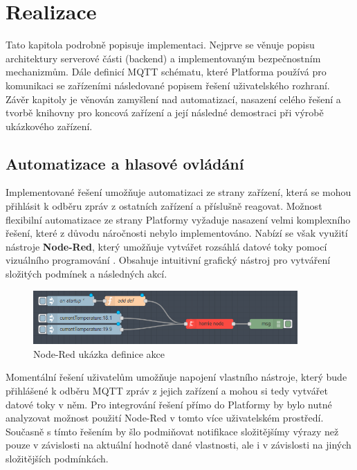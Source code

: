\chapter{Realizace}
Tato kapitola podrobně popisuje implementaci. Nejprve se věnuje popisu architektury serverové části (backend) a implementovaným bezpečnostním mechanizmům. Dále definicí MQTT schématu, které Platforma používá pro komunikaci se zařízeními následované popisem řešení uživatelského rozhraní. Závěr kapitoly je věnován zamyšlení nad automatizací, nasazení celého řešení a tvorbě knihovny pro koncová zařízení a její následné demostraci při výrobě ukázkového zařízení.





\section{Automatizace a hlasové ovládání}
Implementované řešení umožňuje automatizaci ze strany zařízení, která se mohou přihlásit k odběru zpráv z ostatních zařízení a příslušně reagovat. Možnost flexibilní automatizace ze strany Platformy vyžaduje nasazení velmi komplexního řešení, které z důvodu náročnosti nebylo implementováno. Nabízí se však využití nástroje \textbf{Node-Red}, který umožňuje vytvářet rozsáhlá datové toky pomocí vizuálního programování \cite{node-red}. Obsahuje intuitivní grafický nástroj pro vytváření složitých podmínek a následných akcí.

\begin{figure}[htbp]
    \centering
    \includegraphics[width=0.9\textwidth]{img/homie-node-node.png}
    \caption{Node-Red ukázka definice akce \cite{node-red-homie}}
\end{figure}

Momentální řešení uživatelům umožňuje napojení vlastního nástroje, který bude přihlášené k odběru MQTT zpráv z jejich zařízení a mohou si tedy vytvářet datové toky v něm. Pro integrování řešení přímo do Platformy by bylo nutné analyzovat možnost použití Node-Red v tomto více uživatelském prostředí. Současně s tímto řešením by šlo podmiňovat notifikace složitějšímy výrazy než pouze v závislosti na aktuální hodnotě dané vlastnosti, ale i v závislosti na jiných složitějších podmínkách.

